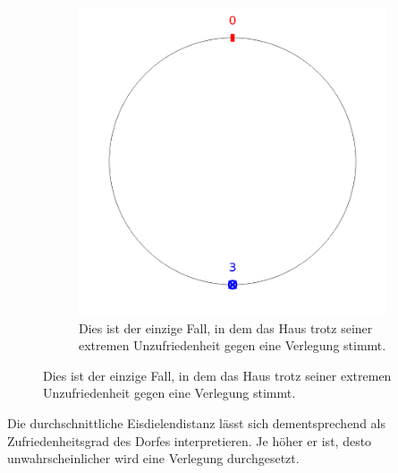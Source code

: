 \documentclass[a4paper,10pt,ngerman]{scrartcl}
\newcommand{\imageWidth}{0.3\linewidth}
\begin{document}
\begin{figure}[h!]
\begin{subfigure}[t]{\imageWidth}
        \includegraphics[width=\linewidth]{03_slightly_happy_house.png}
        \caption{Dies ist der einzige Fall, in dem das Haus trotz seiner extremen Unzufriedenheit gegen eine Verlegung stimmt.}
        \label{fig:03_slightly_happy_house}
    \end{subfigure}
\end{figure}
Die durchschnittliche Eisdielendistanz lässt sich dementsprechend als \glqq Zufriedenheitsgrad\grqq{} des Dorfes interpretieren.
Je höher er ist, desto unwahrscheinlicher wird eine Verlegung durchgesetzt.
\end{document}
